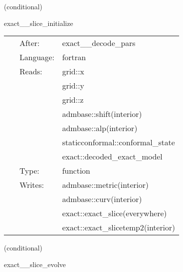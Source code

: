 \vspace{5mm}

   (conditional) 

\hspace{5mm} exact\_\_slice\_initialize 

\hspace{5mm}{\it set initial data from exact solution on arbitrary slice } 


\hspace{5mm}

 \begin{tabular*}{160mm}{cll} 
~ & After:  & exact\_\_decode\_pars \\ 
~ & Language:  & fortran \\ 
~ & Reads:  & grid::x \\ 
~& ~ &grid::y\\ 
~& ~ &grid::z\\ 
~& ~ &admbase::shift(interior)\\ 
~& ~ &admbase::alp(interior)\\ 
~& ~ &staticconformal::conformal\_state\\ 
~& ~ &exact::decoded\_exact\_model\\ 
~ & Type:  & function \\ 
~ & Writes:  & admbase::metric(interior) \\ 
~& ~ &admbase::curv(interior)\\ 
~& ~ &exact::exact\_slice(everywhere)\\ 
~& ~ &exact::exact\_slicetemp2(interior)\\ 
\end{tabular*} 


\vspace{5mm}

   (conditional) 

\hspace{5mm} exact\_\_slice\_evolve 

\hspace{5mm}{\it evolve arbitrary slice and extract cauchy data } 


\hspace{5mm}

